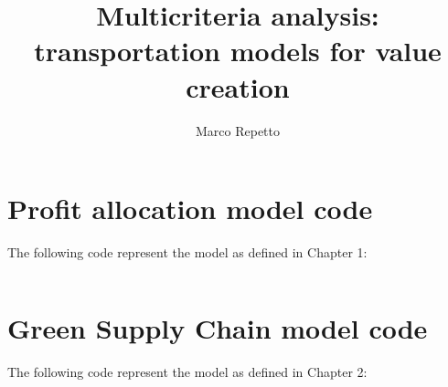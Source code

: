 \documentclass[a4paper,12pt,twoside]{book}
\begin{document}
  
\title{Multicriteria analysis: transportation models for value creation}																
\author{Marco Repetto \hfill}
	
	\maketitle
	\salvastmpB
	\clearpage{\pagestyle{empty}\cleardoublepage}
	\tableofcontents	
	\listoffigures		
	\listoftables	%
	
	
	
	
	\begin{appendices}
	\chapter{Profit allocation model code}
	The following code represent the model as defined in Chapter 1:
	\inputminted{text}{models/GP.lng}
	\chapter{Green Supply Chain model code}
	The following code represent the model as defined in Chapter 2:
	\inputminted{AMPL}{models/ampl.mod}
	\end{appendices}
	\printbibliography
	
	
\end{document}
